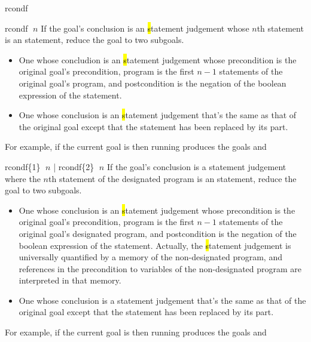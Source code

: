 \begin{tactic}{rcondf}
  \begin{tsyntax}{rcondf $\;n$}
    If the goal's conclusion is an \hl statement judgement whose $n$th
    statement is an  statement, reduce the goal to two
    subgoals.
    \begin{itemize}
    \item One whose concludion is an \hl statement judgement whose
      precondition is the original goal's precondition, program is the
      first $n-1$ statements of the original goal's program, and
      postcondition is the negation of the boolean expression of the
       statement.
   
    \item One whose conclusion is an \hl statement judgement that's
      the same as that of the original goal except that the 
      statement has been replaced by its  part.
    \end{itemize}

    \medskip For example, if the current goal is
     then
    running 
    produces the goals
     and
  \end{tsyntax}

  \begin{tsyntax}{rcondf\{1\} $\;n$ | rcondf\{2\} $\;n$}
    If the goal's conclusion is a \prhl statement judgement where the
    $n$th statement of the designated program is an  statement,
    reduce the goal to two subgoals.
    \begin{itemize}
    \item One whose conclusion is an \hl statement judgement whose
      precondition is the original goal's precondition, program is the
      first $n-1$ statements of the original goal's designated
      program, and postcondition is the negation of the boolean
      expression of the  statement. Actually, the \hl statement
      judgement is universally quantified by a memory of the
      non-designated program, and references in the precondition to
      variables of the non-designated program are interpreted in that
      memory.
   
    \item One whose conclusion is a \prhl statement judgement that's
      the same as that of the original goal except that the 
      statement has been replaced by its  part.
    \end{itemize}

  \medskip
  For example, if the current goal is
   then
  running 
  produces the goals
  and
  \end{tsyntax}
\end{tactic}
